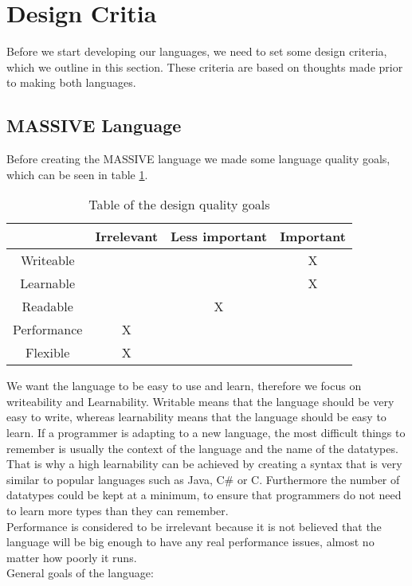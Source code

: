 \section{Design Critia}
\label{sec:designcrit}
Before we start developing our languages, we need to set some design criteria, which we outline in this section. These criteria are based on thoughts made prior to making both languages.

\subsection{MASSIVE Language}
Before creating the MASSIVE language we made some language quality goals, which can be seen in table \ref{table:priorities}.

\begin{table}[ht]
\caption{Table of the design quality goals} %
\centering %
\begin{tabular}{cccc} %
\hline\hline %
 & Irrelevant & Less important & Important \\ [0.5ex] %
\hline %
Writeable &  &  & X\\ %
Learnable &  &  & X\\
Readable &  & X & \\
Performance & X &  & \\
Flexible & X &  & \\ [1ex] %
\hline %
\end{tabular} 
\label{table:priorities} %
\end{table}

We want the language to be easy to use and learn, therefore we focus on writeability and Learnability. Writable means that the language should be very easy to write, whereas learnability means that the language should be easy to learn. If a programmer is adapting to a new language, the most difficult things to remember is usually the context of the language and the name of the datatypes. That is why a high learnability can be achieved by creating a syntax that is very similar to popular languages such as Java, C\# or C. Furthermore the number of datatypes could be kept at a minimum, to ensure that programmers do not need to learn more types than they can remember.\\
\indent Performance is considered to be irrelevant because it is not believed that the language will be big enough to have any real performance issues, almost no matter how poorly it runs.\\
General goals of the language:

